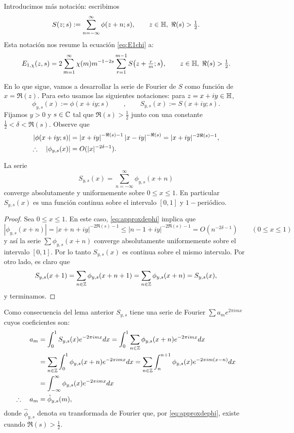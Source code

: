 Introducimos m\'as notaci\'on: escribimos
\begin{equation}\label{eq:S}
  S(z;s):=\sum_{n=-\infty}^{\infty}\phi(z+n;s),\qquad z\in\mathbb{H},\;\Re(s)>\tfrac{1}{2}.
\end{equation}
Esta notaci\'on nos resume la ecuaci\'on \eqref{eq:E1chi} a:
\begin{equation}
  \label{eq:EviaS}
  E_{1,\chi}(z,s)=2\sum_{m=1}^{\infty}\chi(m)m^{-1-2s}\sum_{r=1}^{m-1}S\big(z+\tfrac{r}{m};s\big),
  \qquad z\in\mathbb{H},\;\Re(s)>\tfrac{1}{2}.
\end{equation}

En lo que sigue, vamos a desarrollar la serie de Fourier de $S$ como funci\'on de $x=\Re(z)$.
Para esto usamos las siguientes notaciones: para $z=x+iy\in\mathbb{H}$,
\[
  \phi_{y,s}(x):=\phi(x+iy;s)\qquad,\qquad S_{y,s}(x):=S(x+iy;s).
\]
Fijamos $y>0$ y $s\in\mathbb{C}$ tal que $\Re(s)>\tfrac{1}{2}$ junto con una constante $\tfrac{1}{2}<\delta<\Re(s)$.
Observe que
\begin{align}
  \left| \phi(x+iy;s) \right|
  &=\left| x+iy \right|^{-\Re(s)-1}\left| x-iy \right|^{-\Re(s)}=|x+iy|^{-2\Re(s)-1},\label{eq:approxdephi}\\
    \therefore\quad|\phi_{y,s}(x)|
  &=O(|x|^{-2\delta-1}).\nonumber
\end{align}

\begin{lema}
  La serie
  \[
    S_{y,s}(x)=\sum_{n=-\infty}^{\infty}\phi_{y,s}(x+n)
  \]
converge absolutamente y uniformemente sobre $0\leq x\leq1$. En particular
$S_{y,s}(x)$ es una funci\'on continua sobre el intervalo $[0,1]$ y $1-$peri\'odico.
\end{lema}

\begin{proof}
Sea $0\leq x\leq1$. En este caso, \eqref{eq:approxdephi} implica que
\[
  |\phi_{y,s}(x+n)|=|x+n+iy|^{-2\Re(s)-1}\leq |n-1+iy|^{-2\Re(s)-1}
  =O(n^{-2\delta-1})\qquad (0\leq x\leq 1)
\]
y as\'i la serie $\sum\phi_{y,s}(x+n)$ converge absolutamente  uniformemente sobre el intervalo
$[0,1]$. Por lo tanto $S_{y,s}(x)$ es continua sobre el mismo intervalo. Por otro lado, es claro que
\[
  S_{y,s}(x+1)
  =\sum_{n\in\mathbb{Z}}\phi_{y,s}(x+n+1)
  =\sum_{n\in\mathbb{Z}}\phi_{y,s}(x+n)
  =S_{y,s}(x),
\]
y terminamos.
\end{proof}


Como consecuencia del lema anterior  $S_{y,s}$ tiene una serie de Fourier
$\sum a_m e^{2\pi imx}$ cuyos coeficientes son:
\begin{align*}
  a_m
  &=\int_0^1 S_{y,s}(x)e^{-2\pi imx}dx
    =\int_0^1\sum_{n\in\mathbb{Z}}\phi_{y,s}(x+n)e^{-2\pi imx}dx\\
  &=\sum_{n\in\mathbb{Z}}\int_0^1\phi_{y,s}(x+n)e^{-2\pi imx}dx
    =\sum_{n\in\mathbb{Z}}\int_n^{n+1}\phi_{y,s}(x)e^{-2\pi im(x-n)}dx\\
  &=\int_{-\infty}^{\infty}\phi_{y,s}(x)e^{-2\pi imx}dx\\
  \therefore\quad a_m
  &=\hat{\phi}_{y,s}(m),
\end{align*}
donde $\hat{\phi}_{y,s}$ denota su transformada de Fourier que,
por \eqref{eq:approxdephi}, existe cuando $\Re(s)>\tfrac{1}{2}$.

